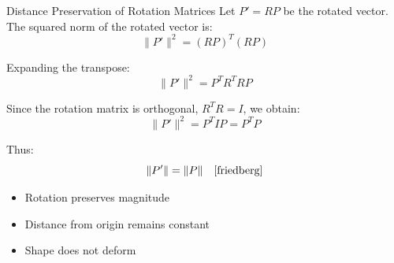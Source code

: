 \documentclass{beamer}
\begin{document}
\begin{frame}{Distance Preservation of Rotation Matrices}
Let $P' = RP$ be the rotated vector. The squared norm of the rotated vector is:
\[
\|P'\|^2 = (RP)^T(RP)
\]

Expanding the transpose:
\[
\|P'\|^2 = P^TR^TRP
\]

Since the rotation matrix is orthogonal, $R^TR = I$, we obtain:
\[
\|P'\|^2 = P^TIP = P^TP
\]

Thus:
\[
\|P'\| = \|P\| \quad \cite{friedberg}
\]

\begin{itemize}
\item Rotation preserves magnitude
\item Distance from origin remains constant
\item Shape does not deform
\end{itemize}
\end{frame}
\end{document}
